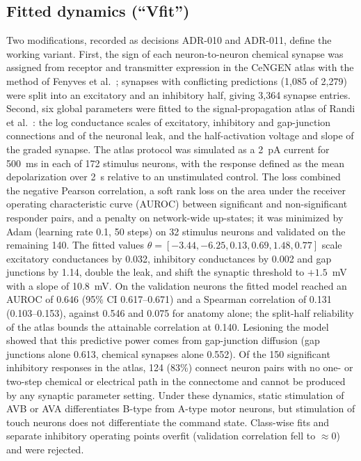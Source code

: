 \documentclass[11pt,a4paper]{article}
\begin{document}
\subsection*{Fitted dynamics (``Vfit'')}
Two modifications, recorded as decisions ADR-010 and ADR-011, define the working variant. First, the sign of each neuron-to-neuron chemical synapse was assigned from receptor and transmitter expression in the CeNGEN atlas \cite{r15} with the method of Fenyves et al.\ \cite{r16}; synapses with conflicting predictions (1,085 of 2,279) were split into an excitatory and an inhibitory half, giving 3,364 synapse entries. Second, six global parameters were fitted to the signal-propagation atlas of Randi et al.\ \cite{r2}: the log conductance scales of excitatory, inhibitory and gap-junction connections and of the neuronal leak, and the half-activation voltage and slope of the graded synapse. The atlas protocol was simulated as a 2~pA current for 500~ms in each of 172 stimulus neurons, with the response defined as the mean depolarization over 2~s relative to an unstimulated control. The loss combined the negative Pearson correlation, a soft rank loss on the area under the receiver operating characteristic curve (AUROC) between significant and non-significant responder pairs, and a penalty on network-wide up-states; it was minimized by Adam (learning rate 0.1, 50 steps) on 32 stimulus neurons and validated on the remaining 140. The fitted values $\theta = [-3.44, -6.25, 0.13, 0.69, 1.48, 0.77]$ scale excitatory conductances by 0.032, inhibitory conductances by 0.002 and gap junctions by 1.14, double the leak, and shift the synaptic threshold to $+1.5$~mV with a slope of 10.8~mV. On the validation neurons the fitted model reached an AUROC of 0.646 (95\% CI 0.617--0.671) and a Spearman correlation of 0.131 (0.103--0.153), against 0.546 and 0.075 for anatomy alone; the split-half reliability of the atlas bounds the attainable correlation at 0.140. Lesioning the model showed that this predictive power comes from gap-junction diffusion (gap junctions alone 0.613, chemical synapses alone 0.552). Of the 150 significant inhibitory responses in the atlas, 124 (83\%) connect neuron pairs with no one- or two-step chemical or electrical path in the connectome and cannot be produced by any synaptic parameter setting. Under these dynamics, static stimulation of AVB or AVA differentiates B-type from A-type motor neurons, but stimulation of touch neurons does not differentiate the command state. Class-wise fits and separate inhibitory operating points overfit (validation correlation fell to $\approx 0$) and were rejected.
\end{document}
